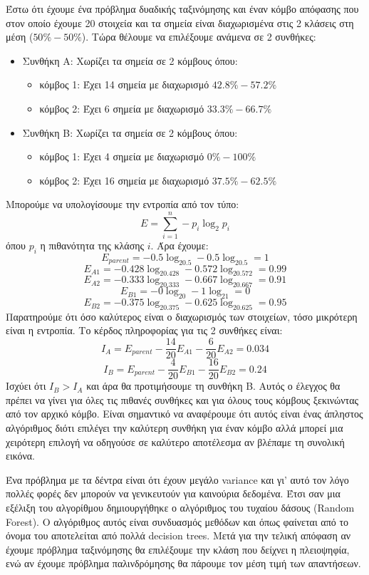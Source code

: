 Έστω ότι έχουμε ένα πρόβλημα δυαδικής ταξινόμησης και έναν κόμβο απόφασης που στον οποίο έχουμε
20 στοιχεία και τα σημεία είναι διαχωρισμένα στις 2 κλάσεις στη μέση ($50\%-50\%$). Τώρα θέλουμε να
επιλέξουμε ανάμενα σε 2 συνθήκες:
\begin{itemize}
    \item Συνθήκη Α: Χωρίζει τα σημεία σε 2 κόμβους όπου:
    \begin{itemize}
        \item κόμβος 1: Έχει 14 σημεία με διαχωρισμό $42.8\%-57.2\%$
        \item κόμβος 2: Έχει 6 σημεία με διαχωρισμό $33.3\%-66.7\%$
    \end{itemize}
    \item Συνθήκη Β: Χωρίζει τα σημεία σε 2 κόμβους όπου:
    \begin{itemize}
        \item κόμβος 1: Έχει 4 σημεία με διαχωρισμό $0\%-100\%$
        \item κόμβος 2: Έχει 16 σημεία με διαχωρισμό $37.5\%-62.5\%$
    \end{itemize}
\end{itemize}
Μπορούμε να υπολογίσουμε την εντροπία από τον τύπο:
$$E=\sum\limits_{i=1}^{n}-p_i\log_2p_i$$
όπου $p_i$ η πιθανότητα της κλάσης $i$. Άρα έχουμε:
$$E_{parent}=-0.5\log_20.5-0.5\log_20.5=1$$
$$E_{A1}=-0.428\log_20.428-0.572\log_20.572=0.99$$
$$E_{A2}=-0.333\log_20.333-0.667\log_20.667=0.91$$
$$E_{B1}=-0\log_20-1\log_21=0$$
$$E_{B2}=-0.375\log_20.375-0.625\log_20.625=0.95$$
Παρατηρούμε ότι όσο καλύτερος είναι ο διαχωρισμός των στοιχείων, τόσο μικρότερη είναι η εντροπία.
Το κέρδος πληροφορίας για τις 2 συνθήκες είναι:
$$I_A=E_{parent}-\frac{14}{20}E_{A1}-\frac{6}{20}E_{A2}=0.034$$
$$I_B=E_{parent}-\frac{4}{20}E_{B1}-\frac{16}{20}E_{B2}=0.24$$
Ισχύει ότι $I_B>I_A$ και άρα θα προτιμήσουμε τη συνθήκη Β. Αυτός ο έλεγχος θα πρέπει να γίνει για
όλες τις πιθανές συνθήκες και για όλους τους κόμβους ξεκινώντας από τον αρχικό κόμβο. Είναι
σημαντικό να αναφέρουμε ότι αυτός είναι ένας άπληστος αλγόριθμος διότι επιλέγει την καλύτερη
συνθήκη για έναν κόμβο αλλά μπορεί μια χειρότερη επιλογή να οδηγούσε σε καλύτερο αποτέλεσμα αν
βλέπαμε τη συνολική εικόνα.

Ένα πρόβλημα με τα δέντρα είναι ότι έχουν μεγάλο \textlatin{variance} και γι' αυτό τον λόγο πολλές
φορές δεν μπορούν να γενικευτούν για καινούρια δεδομένα. Έτσι σαν μια εξέλιξη του αλγορίθμου
δημιουργήθηκε ο αλγόριθμος του τυχαίου δάσους (\textlatin{Random Forest}). Ο αλγόριθμος αυτός
είναι συνδυασμός μεθόδων και όπως φαίνεται από το όνομα του αποτελείται από πολλά
\textlatin{decision trees}. Μετά για την τελική απόφαση αν έχουμε πρόβλημα ταξινόμησης θα
επιλέξουμε την κλάση που δείχνει η πλειοψηφία, ενώ αν έχουμε πρόβλημα παλινδρόμησης θα πάρουμε
τον μέση τιμή των απαντήσεων\cite{wikirf}.

